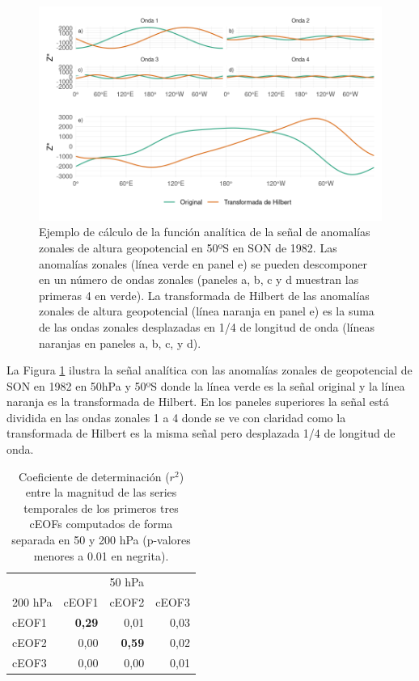 \documentclass[12pt,oneside,a4paper]{reedthesis}
\begin{document}
\begin{figure}

{\centering \includegraphics{figures/20-ceofs/hilbert-ejemplo-1} 

}

\caption{Ejemplo de cálculo de la función analítica de la señal de anomalías zonales de altura geopotencial en 50ºS en SON de 1982. Las anomalías zonales (línea verde en panel e) se pueden descomponer en un número de ondas zonales (paneles a, b, c y d muestran las primeras 4 en verde). La transformada de Hilbert de las anomalías zonales de altura geopotencial (línea naranja en panel e) es la suma de las ondas zonales desplazadas en 1/4 de longitud de onda (líneas naranjas en paneles a, b, c, y d).}\label{fig:hilbert-ejemplo}
\end{figure}

La Figura \ref{fig:hilbert-ejemplo} ilustra la señal analítica con las anomalías zonales de geopotencial de SON en 1982 en 50hPa y 50ºS donde la línea verde es la señal original y la línea naranja es la transformada de Hilbert.
En los paneles superiores la señal está dividida en las ondas zonales 1 a 4 donde se ve con claridad como la transformada de Hilbert es la misma señal pero desplazada 1/4 de longitud de onda.



\begin{table}

\caption{\label{tab:corr-ceof-splitted}Coeficiente de determinación (\(r^2\)) entre la magnitud de las series temporales de los primeros tres cEOFs computados de forma separada en 50 y 200 hPa (p-valores menores a 0.01 en negrita).}
\centering
\begin{tabular}[t]{l>{}r>{}r>{}r}
\toprule
\multicolumn{1}{c}{} & \multicolumn{3}{c}{50 hPa} \\
\cmidrule(l{3pt}r{3pt}){2-4}
200 hPa & cEOF1 & cEOF2 & cEOF3\\
\midrule
cEOF1 & \textbf{0,29} & 0,01 & 0,03\\
cEOF2 & 0,00 & \textbf{0,59} & 0,02\\
cEOF3 & 0,00 & 0,00 & 0,01\\
\bottomrule
\end{tabular}
\end{table}
\end{document}
